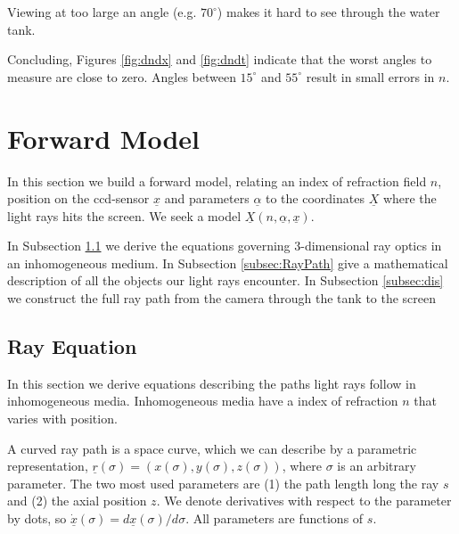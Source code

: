 \documentclass[draft]{svjour3}                     %
\begin{document}
Viewing at too large an angle (e.g. $70^\circ$) makes it hard to see through the water tank. 


Concluding, Figures \ref{fig:dndx} and \ref{fig:dndt} indicate that the worst angles to measure are close to zero. Angles between $15^\circ$ and $55^\circ$ result in small errors in $n$. 
 
\section{Forward Model}
\label{sec:formod}
In this section we build a forward model, relating an index of refraction field $n$, position on the ccd-sensor $\underline{x}$ and parameters $\underline{\alpha}$ to the coordinates $\underline{X}$ where the light rays hits the screen. We seek a model $\underline{X}(n, \underline{\alpha}, \underline{x})$. 

In Subsection \ref{subsec:rayequ} we derive the equations governing 3-dimensional ray optics in an inhomogeneous medium. In Subsection \ref{subsec:RayPath} give a mathematical description of all the objects our light rays encounter. In Subsection \ref{subsec:dis} we construct the full ray path from the camera through the tank to the screen

\subsection{Ray Equation} 
\label{subsec:rayequ}
In this section we derive equations describing the paths light rays follow in inhomogeneous media. Inhomogeneous media have a index of refraction $n$ that varies with position.

A curved ray path is a space curve, which we can describe by a parametric representation, $\underline{r}(\sigma) = ( x(\sigma), y(\sigma), z(\sigma))$, where $\sigma$ is an arbitrary parameter. The two most used parameters are (1) the path length long the ray $s$ and (2) the axial position $z$. We denote derivatives with respect to the parameter by dots, so $\dot{\underline{x}}(\sigma) = d\underline{x}(\sigma)/d\sigma$. All parameters are functions of $s$.
\end{document}
